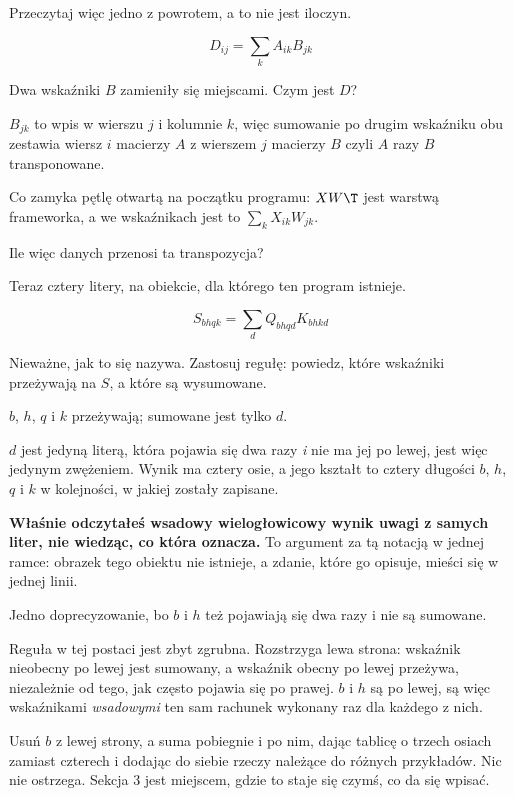 \begin{fr}
Przeczytaj więc jedno z powrotem, a to nie jest iloczyn.

\[ D_{ij} = \sum_k A_{ik} B_{jk} \]

Dwa wskaźniki $B$ zamieniły się miejscami. Czym jest $D$?
\dotline
\nextframe
\end{fr}

\begin{fr}
$B_{jk}$ to wpis w wierszu $j$ i kolumnie $k$, więc sumowanie po drugim
wskaźniku obu zestawia wiersz $i$ macierzy $A$ z wierszem $j$ macierzy $B$
\dash{} czyli $A$ razy $B$ transponowane.

Co zamyka pętlę otwartą na początku programu: $XW\T$ jest warstwą frameworka, a
we wskaźnikach jest to $\sum_k X_{ik} W_{jk}$.

Ile więc danych przenosi ta transpozycja?
\dotline
\nextframe
\end{fr}

\begin{fr}
Teraz cztery litery, na obiekcie, dla którego ten program istnieje.

\[ S_{bhqk} = \sum_d Q_{bhqd} K_{bhkd} \]

Nieważne, jak to się nazywa. Zastosuj regułę: powiedz, które wskaźniki
przeżywają na $S$, a które są wysumowane.
\dotline
\nextframe
\end{fr}

\begin{fr}
\begin{ansblock}
$b$, $h$, $q$ i $k$ przeżywają; sumowane jest tylko $d$.
\end{ansblock}

$d$ jest jedyną literą, która pojawia się dwa razy \emph{i} nie ma jej po
lewej, jest więc jedynym zwężeniem. Wynik ma cztery osie, a jego kształt to
cztery długości $b$, $h$, $q$ i $k$ w kolejności, w jakiej zostały zapisane.

\textbf{Właśnie odczytałeś wsadowy wielogłowicowy wynik uwagi z samych liter,
nie wiedząc, co która oznacza.} To argument za tą notacją w jednej ramce:
obrazek tego obiektu nie istnieje, a zdanie, które go opisuje, mieści się w
jednej linii.
\end{fr}

\begin{fr}
Jedno doprecyzowanie, bo $b$ i $h$ też pojawiają się dwa razy i nie są sumowane.

Reguła w tej postaci jest zbyt zgrubna. Rozstrzyga lewa strona: wskaźnik
nieobecny po lewej jest sumowany, a wskaźnik obecny po lewej przeżywa,
niezależnie od tego, jak często pojawia się po prawej. $b$ i $h$ są po lewej,
są więc wskaźnikami \emph{wsadowymi} \dash{} ten sam rachunek wykonany raz dla
każdego z nich.

Usuń $b$ z lewej strony, a suma pobiegnie i po nim, dając tablicę o trzech
osiach zamiast czterech i dodając do siebie rzeczy należące do różnych
przykładów. Nic nie ostrzega. Sekcja 3 jest miejscem, gdzie to staje się czymś,
co da się wpisać.
\end{fr}

